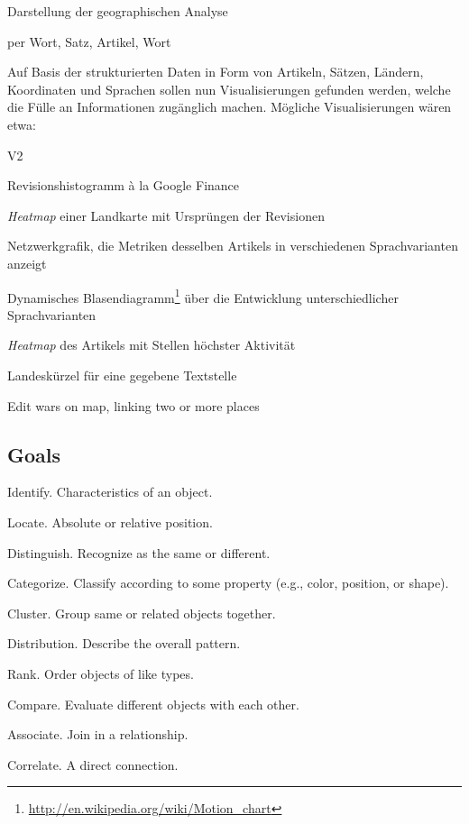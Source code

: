 \begin{todos}
    \item Darstellung der geographischen Analyse
    \item per Wort, Satz, Artikel, Wort
\end{todos}

Auf Basis der strukturierten Daten in Form von Artikeln, Sätzen, Ländern, Koordinaten und Sprachen sollen nun Visualisierungen gefunden werden, welche die Fülle an Informationen zugänglich machen.
Mögliche Visualisierungen wären etwa:

\begin{labeling}{V2}
\item[V1] Revisionshistogramm à la Google Finance 
\item[V2] \emph{Heatmap} einer Landkarte mit Ursprüngen der Revisionen 
\item[V3] Netzwerkgrafik, die Metriken desselben Artikels in verschiedenen Sprachvarianten anzeigt
\item[V4] Dynamisches Blasendiagramm\footnote{\url{http://en.wikipedia.org/wiki/Motion_chart}} über die Entwicklung unterschiedlicher Sprachvarianten
\item[V5] \emph{Heatmap} des Artikels mit Stellen höchster Aktivität 
\item[V6] Landeskürzel für eine gegebene Textstelle
\item[V7] Edit wars on map, linking two or more places
\end{labeling}


\subsection{Goals}

\begin{todos}
    \item {}
    \item Identify. Characteristics of an object.
    \item Locate. Absolute or relative position.
    \item Distinguish. Recognize as the same or different.
    \item Categorize. Classify according to some property (e.g., color, position, or shape).
    \item Cluster. Group same or related objects together.
    \item Distribution. Describe the overall pattern.
    \item Rank. Order objects of like types.
    \item Compare. Evaluate different objects with each other.
    \item Associate. Join in a relationship.
    \item Correlate. A direct connection.
\end{todos}


